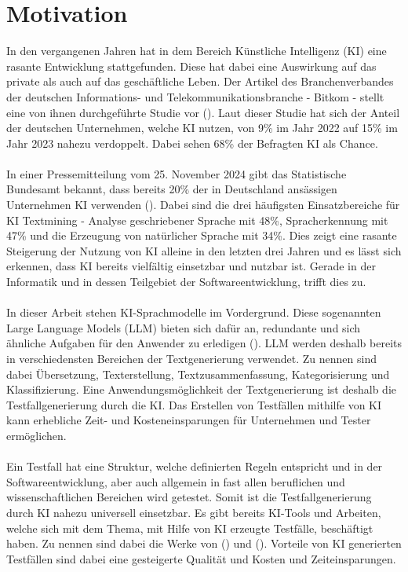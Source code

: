 \documentclass[12pt,toc=bib,toc=listof]{scrreprt}
\begin{document}
\section{Motivation} %
\label{sec:motivation}
In den vergangenen Jahren hat in dem Bereich Künstliche Intelligenz (KI) eine rasante Entwicklung stattgefunden. Diese hat dabei eine Auswirkung auf das private als auch auf das geschäftliche Leben. Der Artikel des Branchenverbandes der deutschen Informations- und Telekommunikationsbranche - Bitkom - stellt eine von ihnen durchgeführte Studie vor (\cite{StreimHecker2023}). Laut dieser Studie hat sich der Anteil der deutschen Unternehmen, welche KI nutzen, von 9\% im Jahr 2022 auf 15\% im Jahr 2023 nahezu verdoppelt. Dabei sehen 68\% der Befragten KI als Chance.\\
\\
In einer Pressemitteilung vom 25. November 2024 gibt das Statistische Bundesamt bekannt, dass bereits 20\% der in Deutschland ansässigen Unternehmen KI verwenden (\cite{StatistischesBundesamt2024}). Dabei sind die drei häufigsten Einsatzbereiche für KI Textmining - Analyse geschriebener Sprache mit 48\%, Spracherkennung mit 47\% und die Erzeugung von natürlicher Sprache mit 34\%. Dies zeigt eine rasante Steigerung der Nutzung von KI alleine in den letzten drei Jahren und es lässt sich erkennen, dass KI bereits vielfältig einsetzbar und nutzbar ist. Gerade in der Informatik und in dessen Teilgebiet der Softwareentwicklung, trifft dies zu.\\
\\
In dieser Arbeit stehen KI-Sprachmodelle im Vordergrund. Diese sogenannten Large Language Models (LLM) bieten sich  dafür an, redundante und sich ähnliche Aufgaben für den Anwender zu erledigen (\cite{Kerner2024}). LLM werden deshalb bereits in verschiedensten Bereichen der Textgenerierung verwendet. Zu nennen sind dabei Übersetzung, Texterstellung, Textzusammenfassung, Kategorisierung und Klassifizierung. Eine Anwendungsmöglichkeit der Textgenerierung ist deshalb die Testfallgenerierung durch die KI. Das Erstellen von Testfällen mithilfe von KI kann erhebliche Zeit- und Kosteneinsparungen für Unternehmen und Tester ermöglichen.\\
\\
Ein Testfall hat eine Struktur, welche definierten Regeln entspricht und in der Softwareentwicklung, aber auch allgemein in fast allen beruflichen und wissenschaftlichen Bereichen wird getestet. Somit ist die Testfallgenerierung durch KI nahezu universell einsetzbar. Es gibt bereits KI-Tools und Arbeiten, welche sich mit dem Thema, mit Hilfe von KI erzeugte Testfälle, beschäftigt haben. Zu nennen sind dabei die Werke von (\cite{Bozic2022}) und (\cite{WeingartzSuleymanov2024}). Vorteile von KI generierten Testfällen sind dabei eine gesteigerte Qualität und Kosten und Zeiteinsparungen.\\
\end{document}
